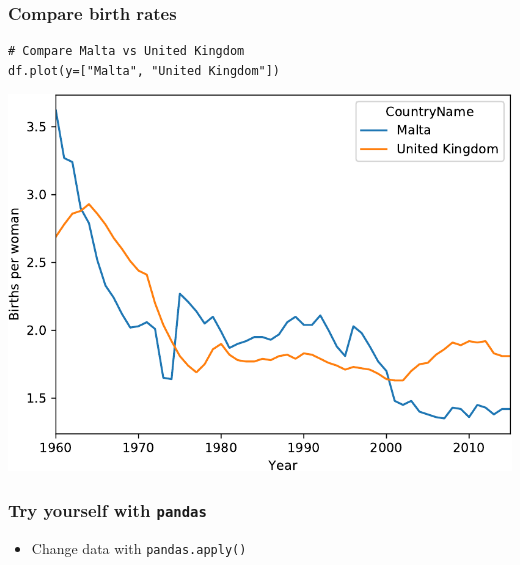 \documentclass[xcolor=table]{beamer}
\begin{document}
\begin{frame}[fragile]
\frametitle{Compare birth rates}

\begin{lstlisting}[style=python]
# Compare Malta vs United Kingdom
df.plot(y=["Malta", "United Kingdom"])
\end{lstlisting}

\vspace{-0.6cm}
\begin{center}
	\includegraphics[width=.7\textwidth]{compare_births.pdf}
\end{center}

\end{frame}

\begin{frame}[fragile]
    \frametitle{Try yourself with \texttt{pandas}}
    \begin{itemize}
        \item Change data with \texttt{pandas.apply()}
    \end{itemize}
\end{frame}

\end{document}
